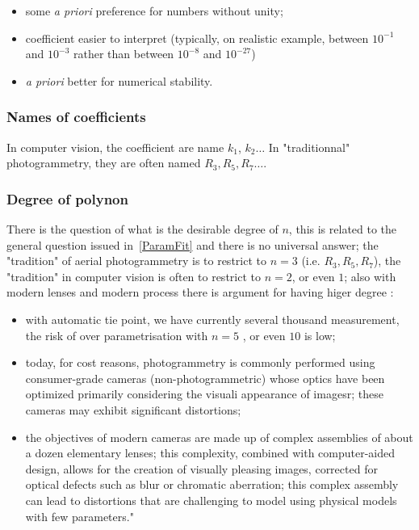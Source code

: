 \begin{itemize}
    \item some \emph{a priori} preference for numbers without unity;

    \item coefficient easier to interpret (typically, on realistic example, between $10^{-1}$ and $10^{-3}$ rather than between $10^{-8}$ and  $10^{-27}$)

    \item \emph{a priori} better for numerical stability.
\end{itemize}


\subsubsection{Names of coefficients}

In computer vision, the coefficient are name $k_1$, $k_2 \dots$ 
In  "traditionnal" photogrammetry, they are often named $R_3,R_5,R_7\dots$.


\subsubsection{Degree of polynon}

There is the question of what is the desirable degree of $n$, this is related to the general question issued in~\ref{ParamFit}
and there is no universal answer;  the "tradition" of aerial photogrammetry is to restrict to $n=3$  (i.e. $R_3,R_5,R_7$),
the "tradition" in computer vision is often to restrict to $n=2$, or even $1$;  also with modern lenses and modern
process there is argument for having higer degree  :
           
\begin{itemize}
         \item   with automatic tie point, we have currently several thousand measurement, the risk of over parametrisation
                 with $n=5$ , or even $10$ is low;

         \item today, for cost reasons, photogrammetry is commonly performed using consumer-grade cameras 
                 (non-photogrammetric) whose optics have been optimized primarily considering the visuali
                 appearance of imagesr; these cameras may exhibit significant distortions;

         \item  the objectives of modern cameras are made up of complex assemblies of about a dozen elementary lenses;
                this complexity, combined with computer-aided design, allows for the creation of visually pleasing images,
                corrected for optical defects such as blur or chromatic aberration; this complex assembly can lead to 
                 distortions that are challenging to model using physical models with few parameters."

\end{itemize}

